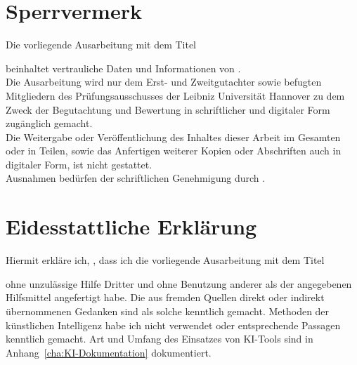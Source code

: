 

\thispagestyle{plain}
\vspace*{9mm}
\section*{Sperrvermerk}
\label{Sperrvermerk}
\vspace*{11mm}

Die vorliegende Ausarbeitung mit dem Titel
%
\vspace*{5mm}
\begin{center}
\Large\emph{\titel}
\end{center}
\vspace*{5mm}
%
beinhaltet vertrauliche Daten und Informationen von \companyname.\\

Die Ausarbeitung wird nur dem Erst- und Zweitgutachter sowie befugten Mitgliedern des Prüfungsausschusses der Leibniz Universität Hannover zu dem Zweck der Begutachtung und Bewertung in schriftlicher und digitaler Form zugänglich gemacht.\\

Die Weitergabe oder Veröffentlichung des Inhaltes dieser Arbeit im Gesamten oder in Teilen, sowie das Anfertigen weiterer Kopien oder Abschriften auch in digitaler Form, ist nicht gestattet.\\

Ausnahmen bedürfen der schriftlichen Genehmigung durch \companyname.

\clearpage


\vspace*{9mm}
\section*{Eidesstattliche Erklärung}
\label{Erklaerung}
\vspace*{11mm}

Hiermit erkläre ich, \name, dass ich die vorliegende Ausarbeitung mit dem Titel
%
\begin{center}
\Large{\emph{\titel}}
\end{center}
%
ohne unzulässige Hilfe Dritter und ohne Benutzung anderer als der angegebenen Hilfsmittel angefertigt habe. Die aus fremden Quellen direkt oder indirekt übernommenen Gedanken sind als solche kenntlich gemacht. Methoden der künstlichen Intelligenz habe ich nicht verwendet oder entsprechende Passagen kenntlich gemacht. Art und Umfang des Einsatzes von KI-Tools sind in Anhang~\ref{cha:KI-Dokumentation} dokumentiert.%

